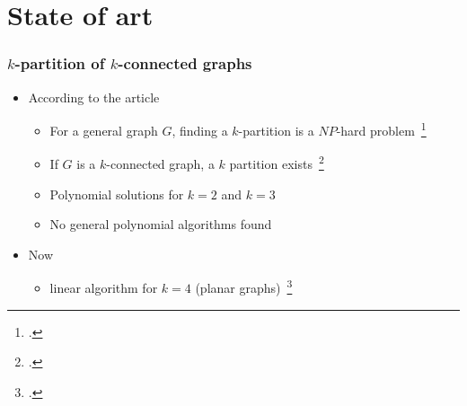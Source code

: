 \section{State of art}
%


\begin{frame}
  \frametitle{$k$-partition of $k$-connected graphs}
  \begin{itemize}
  \item According to the article
    \begin{itemize}
    \item For a general graph $G$, finding a $k$-partition is a $NP$-hard
      problem~\footcite{BF06}%
    \item If $G$ is a $k$-connected graph, a $k$ partition exists~\footcite{GE78,LL77}
    \item Polynomial solutions for $k = 2$ and $k = 3$%
    \item No general polynomial algorithms found
    \end{itemize}
  \item Now
    \begin{itemize}
    \item linear algorithm for $k = 4$ (planar graphs)~\footcite{Nakano1997315}
    \end{itemize}
  \end{itemize}
\end{frame}

